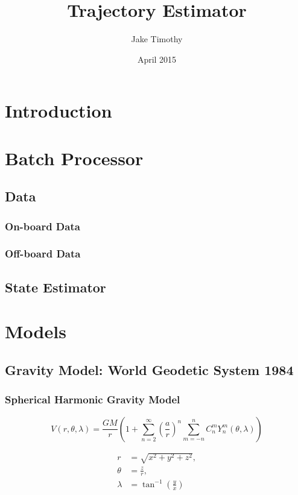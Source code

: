 \documentclass{article}
\title{Trajectory Estimator}
\author{Jake Timothy}
\date{April 2015}
\begin{document}
\maketitle

\section{Introduction}

\section{Batch Processor}
\subsection{Data}
\subsubsection{On-board Data}
\subsubsection{Off-board Data}

\subsection{State Estimator}

\section{Models}
\subsection{Gravity Model: World Geodetic System 1984~\cites{wgs84,egm2008}}
\subsubsection{Spherical Harmonic Gravity Model}
\begin{equation}
V\left(r,\theta,\lambda\right) = \frac{G M}{r} \left(1 + \sum_{n=2}^{\infty} \left(\frac{a}{r}\right)^n \sum_{m=-n}^n C_n^m Y_n^m\left(\theta,\lambda\right)\right)
\end{equation}

\begin{equation}
\begin{split}
r &= \sqrt{x^2+y^2+z^2}, \\
\theta &= \frac{z}{r}, \\
\lambda &= \tan^{-1}\left(\frac{y}{x}\right)
\end{split}
\end{equation}
\end{document}
